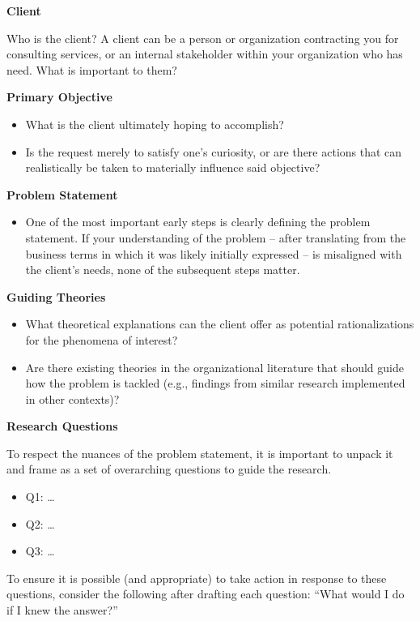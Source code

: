 \documentclass[
]{book}
\providecommand{\tightlist}{%
  \setlength{\itemsep}{0pt}\setlength{\parskip}{0pt}}
\begin{document}
\textbf{Client}

Who is the client? A client can be a person or organization contracting you for consulting services, or an internal stakeholder within your organization who has need. What is important to them?

\textbf{Primary Objective}

\begin{itemize}
\tightlist
\item
  What is the client ultimately hoping to accomplish?
\item
  Is the request merely to satisfy one's curiosity, or are there actions that can realistically be taken to materially influence said objective?
\end{itemize}

\textbf{Problem Statement}

\begin{itemize}
\tightlist
\item
  One of the most important early steps is clearly defining the problem statement. If your understanding of the problem -- after translating from the business terms in which it was likely initially expressed -- is misaligned with the client's needs, none of the subsequent steps matter.
\end{itemize}

\textbf{Guiding Theories}

\begin{itemize}
\tightlist
\item
  What theoretical explanations can the client offer as potential rationalizations for the phenomena of interest?
\item
  Are there existing theories in the organizational literature that should guide how the problem is tackled (e.g., findings from similar research implemented in other contexts)?
\end{itemize}

\textbf{Research Questions}

To respect the nuances of the problem statement, it is important to unpack it and frame as a set of overarching questions to guide the research.

\begin{itemize}
\tightlist
\item
  Q1: \ldots{}
\item
  Q2: \ldots{}
\item
  Q3: \ldots{}
\end{itemize}

To ensure it is possible (and appropriate) to take action in response to these questions, consider the following after drafting each question: ``What would I do if I knew the answer?''
\end{document}
